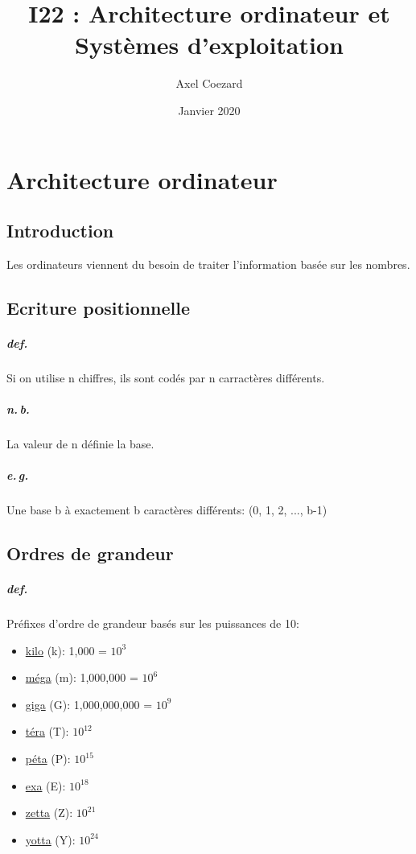 \documentclass{report}
\title{I22 : Architecture ordinateur et Systèmes d'exploitation}
\author{Axel Coezard}
\date{Janvier 2020}
\begin{document}
\maketitle
\newpage

\tableofcontents
\newpage

\chapter{Architecture ordinateur}

\section{Introduction}

  Les ordinateurs viennent du besoin de traiter l'information basée sur les nombres.

\section{Ecriture positionnelle}

  \paragraph{def.} Si on utilise n chiffres, ils sont codés par n carractères différents.

  \paragraph{n.\,b.} La valeur de n définie la base.

  \paragraph{e.\,g.} Une base b à exactement b caractères différents: (0, 1, 2, ..., b-1)

\section{Ordres de grandeur}

  \paragraph{def.} Préfixes d'ordre de grandeur basés sur les puissances de 10:
  \begin{itemize}
    \item \underline{kilo} (k): 1,000 = $10^{3}$
    \item \underline{méga} (m): 1,000,000 = $10^{6}$
    \item \underline{giga} (G): 1,000,000,000 = $10^{9}$
    \item \underline{téra} (T): $10^{12}$
    \item \underline{péta} (P): $10^{15}$
    \item \underline{exa} (E): $10^{18}$
    \item \underline{zetta} (Z): $10^{21}$
    \item \underline{yotta} (Y): $10^{24}$
  \end{itemize}
\end{document}

